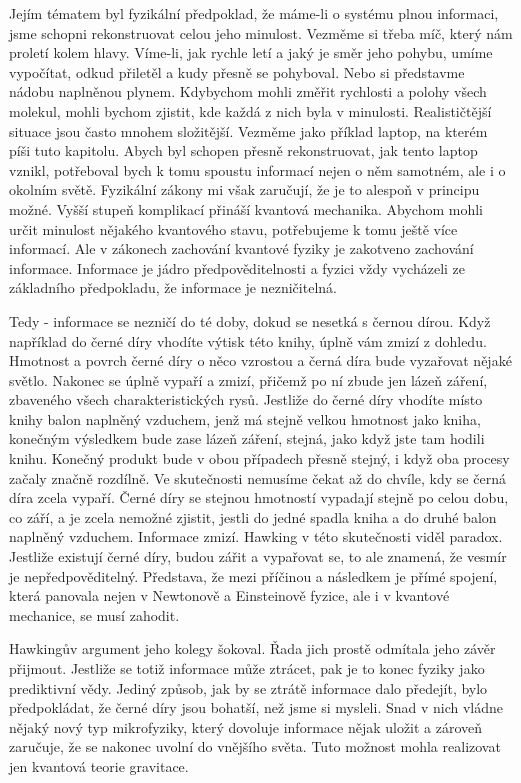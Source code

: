   Jejím tématem byl fyzikální předpoklad, že máme-li o systému plnou informaci, jsme schopni
  rekonstruovat celou jeho minulost. Vezměme si třeba míč, který nám proletí kolem hlavy. Víme-li,
  jak rychle letí a jaký je směr jeho pohybu, umíme vypočítat, odkud přiletěl a kudy přesně se
  pohyboval. Nebo si představme nádobu naplněnou plynem. Kdybychom mohli změřit rychlosti a polohy
  všech molekul, mohli bychom zjistit, kde každá z nich byla v minulosti. Realističtější situace
  jsou často mnohem složitější. Vezměme jako příklad laptop, na kterém píši tuto kapitolu. Abych byl
  schopen přesně rekonstruovat, jak tento laptop vznikl, potřeboval bych k tomu spoustu informací
  nejen o něm samotném, ale i o okolním světě. Fyzikální zákony mi však zaručují, že je to alespoň v
  principu možné. Vyšší stupeň komplikací přináší kvantová mechanika. Abychom mohli určit minulost
  nějakého kvantového stavu, potřebujeme k tomu ještě více informací. Ale v zákonech zachování
  kvantové fyziky je zakotveno zachování informace. Informace je jádro předpověditelnosti a fyzici
  vždy vycházeli ze základního předpokladu, že informace je nezničitelná. 
  
  Tedy - informace se nezničí do té doby, dokud se nesetká s černou dírou. Když například do černé
  díry vhodíte výtisk této knihy, úplně vám zmizí z dohledu. Hmotnost a povrch černé díry o něco
  vzrostou a černá díra bude vyzařovat nějaké světlo. Nakonec se úplně vypaří a zmizí, přičemž po ní
  zbude jen lázeň záření, zbaveného všech charakteristických rysů. Jestliže do černé díry vhodíte
  místo knihy balon naplněný vzduchem, jenž má stejně velkou hmotnost jako kniha, konečným výsledkem
  bude zase lázeň záření, stejná, jako když jste tam hodili knihu. Konečný produkt bude v obou
  případech přesně stejný, i když oba procesy začaly značně rozdílně. Ve skutečnosti nemusíme čekat
  až do chvíle, kdy se černá díra zcela vypaří. Černé díry se stejnou hmotností vypadají stejně po
  celou dobu, co září, a je zcela nemožné zjistit, jestli do jedné spadla kniha a do druhé balon
  naplněný vzduchem. Informace zmizí. Hawking v této skutečnosti viděl paradox. Jestliže existují
  černé díry, budou zářit a vypařovat se, to ale znamená, že vesmír je nepředpověditelný. Představa,
  že mezi příčinou a následkem je přímé spojení, která panovala nejen v Newtonově a Einsteinově
  fyzice, ale i v kvantové mechanice, se musí zahodit. 
  
  Hawkingův argument jeho kolegy šokoval. Řada jich prostě odmítala jeho závěr přijmout. Jestliže se
  totiž informace může ztrácet, pak je to konec fyziky jako prediktivní vědy. Jediný způsob, jak by
  se ztrátě informace dalo předejít, bylo předpokládat, že černé díry jsou bohatší, než jsme si
  mysleli. Snad v nich vládne nějaký nový typ mikrofyziky, který dovoluje informace nějak uložit a
  zároveň zaručuje, že se nakonec uvolní do vnějšího světa. Tuto možnost mohla realizovat jen
  kvantová teorie gravitace. 
  
